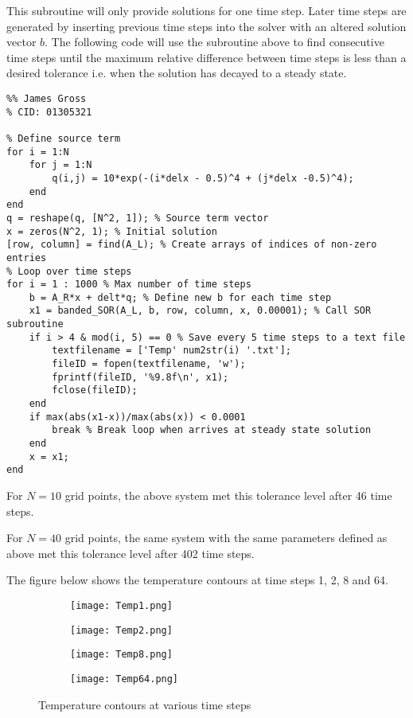 \documentclass[12pt]{article}
\begin{document}
This subroutine will only provide solutions for one time step. Later time steps are generated by inserting previous time steps into the solver with an altered solution vector $b$. The following code will use the subroutine above to find consecutive time steps until the maximum relative difference between time steps is less than a desired tolerance i.e. when the solution has decayed to a steady state.
\begin{lstlisting}
%% James Gross
% CID: 01305321

% Define source term
for i = 1:N
    for j = 1:N
        q(i,j) = 10*exp(-(i*delx - 0.5)^4 + (j*delx -0.5)^4);
    end
end
q = reshape(q, [N^2, 1]); % Source term vector
x = zeros(N^2, 1); % Initial solution
[row, column] = find(A_L); % Create arrays of indices of non-zero entries
% Loop over time steps
for i = 1 : 1000 % Max number of time steps
    b = A_R*x + delt*q; % Define new b for each time step
    x1 = banded_SOR(A_L, b, row, column, x, 0.00001); % Call SOR subroutine
    if i > 4 & mod(i, 5) == 0 % Save every 5 time steps to a text file
        textfilename = ['Temp' num2str(i) '.txt'];
        fileID = fopen(textfilename, 'w');
        fprintf(fileID, '%9.8f\n', x1);
        fclose(fileID);
    end
    if max(abs(x1-x))/max(abs(x)) < 0.0001
        break % Break loop when arrives at steady state solution
    end
    x = x1; 
end
\end{lstlisting}
For $N=10$ grid points, the above system met this tolerance level after 46 time steps. 

For $N=40$ grid points, the same system with the same parameters defined as above met this tolerance level after 402 time steps. 

The figure below shows the temperature contours at time steps 1, 2, 8 and 64.

\begin{figure}[ht] 
  \begin{subfigure}[b]{0.55\linewidth}
    \centering
    \texttt{[image: Temp1.png]} 

    \label{fig7:a} 
    \vspace{4ex}
  \end{subfigure}%
  \begin{subfigure}[b]{0.55\linewidth}
    \centering
    \texttt{[image: Temp2.png]} 
 
    \label{fig7:b} 
    \vspace{4ex}
  \end{subfigure} 
  \begin{subfigure}[b]{0.55\linewidth}
    \centering
    \texttt{[image: Temp8.png]} 
 
    \label{fig7:c} 
  \end{subfigure}%
  \begin{subfigure}[b]{0.55\linewidth}
    \centering
    \texttt{[image: Temp64.png]} 

    \label{fig7:d} 
  \end{subfigure} 
  \caption{Temperature contours at various time steps}
  \label{fig7} 
\end{figure}
\end{document}
